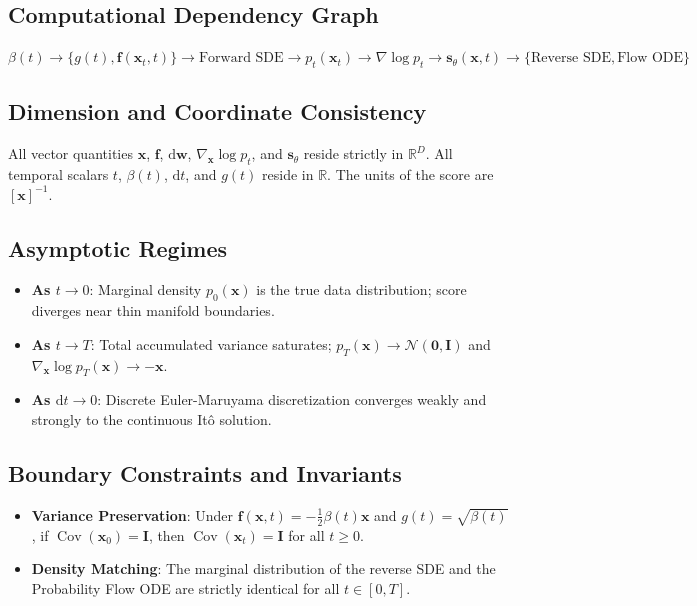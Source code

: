 \documentclass[11pt,a4paper]{article}
\theoremstyle{definition}
\begin{document}
\subsection{Computational Dependency Graph}
{\centering
$\beta(t) \longrightarrow \{g(t), \mathbf{f}(\mathbf{x}_t, t)\} \longrightarrow \text{Forward SDE} \longrightarrow p_t(\mathbf{x}_t) \longrightarrow \nabla \log p_t \longrightarrow \mathbf{s}_\theta(\mathbf{x}, t) \longrightarrow \{\text{Reverse SDE}, \text{Flow ODE}\}$
\par}

\subsection{Dimension and Coordinate Consistency}
All vector quantities $\mathbf{x}$, $\mathbf{f}$, $\mathrm{d}\mathbf{w}$, $\nabla_\mathbf{x}\log p_t$, and $\mathbf{s}_\theta$ reside strictly in $\mathbb{R}^D$. All temporal scalars $t$, $\beta(t)$, $\mathrm{d}t$, and $g(t)$ reside in $\mathbb{R}$. The units of the score are $[\mathbf{x}]^{-1}$.

\subsection{Asymptotic Regimes}
\begin{itemize}
    \item \textbf{As $t \to 0$}: Marginal density $p_0(\mathbf{x})$ is the true data distribution; score diverges near thin manifold boundaries.
    \item \textbf{As $t \to T$}: Total accumulated variance saturates; $p_T(\mathbf{x}) \to \mathcal{N}(\mathbf{0}, \mathbf{I})$ and $\nabla_\mathbf{x} \log p_T(\mathbf{x}) \to -\mathbf{x}$.
    \item \textbf{As $\mathrm{d}t \to 0$}: Discrete Euler-Maruyama discretization converges weakly and strongly to the continuous It\^o solution.
\end{itemize}

\subsection{Boundary Constraints and Invariants}
\begin{itemize}
    \item \textbf{Variance Preservation}: Under $\mathbf{f}(\mathbf{x}, t) = -\frac{1}{2}\beta(t)\mathbf{x}$ and $g(t) = \sqrt{\beta(t)}$, if $\operatorname{Cov}(\mathbf{x}_0) = \mathbf{I}$, then $\operatorname{Cov}(\mathbf{x}_t) = \mathbf{I}$ for all $t \ge 0$.
    \item \textbf{Density Matching}: The marginal distribution of the reverse SDE and the Probability Flow ODE are strictly identical for all $t \in [0, T]$.
\end{itemize}
\end{document}
